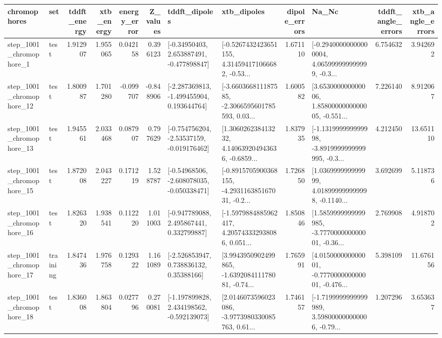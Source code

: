 \begin{tabular}{llrrrrllrlrr}
\toprule
             chromophores &       set &  tddft\_energy &  xtb\_energy &  energy\_error &  Z\_values &                               tddft\_dipoles &                                        xtb\_dipoles &  dipole\_errors &                                              Na\_Nc &  tddft\_angle\_errors &  xtb\_angle\_errors \\
\midrule
  step\_1001\_chromophore\_1 &      test &      1.912907 &    1.955065 &      0.042158 &  0.396123 &    [-0.34950403, 2.653887491, -0.477898847] &  [-0.5267432423651155, 4.314594171066682, -0.53... &       1.671110 &  [-0.29400000000000004, 4.065999999999999, -0.3... &            6.754632 &          3.942692 \\
 step\_1001\_chromophore\_12 &      test &      1.800987 &    1.701280 &     -0.099707 & -0.848906 &   [-2.287369813, -1.499455904, 0.193644764] &  [-3.660366811187585, -2.3066595601785593, 0.03... &       1.600582 &  [3.653000000000006, 1.8580000000000005, -0.551... &            7.226140 &          8.912067 \\
 step\_1001\_chromophore\_13 &      test &      1.945561 &    2.033468 &      0.087907 &  0.797629 &   [-0.754756204, -2.53537159, -0.019176462] &  [1.306026238413232, 4.140639204943636, -0.6859... &       1.837935 &  [-1.131999999999998, -3.8919999999999995, -0.3... &            4.212450 &         13.651110 \\
 step\_1001\_chromophore\_15 &      test &      1.872008 &    2.043227 &      0.171219 &  1.528787 &   [-0.54968506, -2.608078035, -0.050338471] &  [-0.8915705900368155, -4.293116385167031, -0.2... &       1.726850 &  [1.036999999999999, 4.018999999999998, -0.1140... &            3.692699 &          5.118736 \\
 step\_1001\_chromophore\_16 &      test &      1.826320 &    1.938541 &      0.112220 &  1.011003 &    [-0.947789088, 2.495867441, 0.332799887] &  [-1.5979884885962417, 4.205743332938086, 0.051... &       1.850846 &  [1.5859999999999985, -3.777000000000001, -0.36... &            2.769908 &          4.918702 \\
 step\_1001\_chromophore\_17 &  training &      1.847436 &    1.976758 &      0.129322 &  1.161089 &     [-2.526853947, 0.738836132, 0.35388166] &  [3.9943950902499865, -1.639208411178081, -0.74... &       1.765991 &  [4.015000000000001, -0.777000000000001, -0.476... &            5.398109 &         11.676156 \\
 step\_1001\_chromophore\_18 &      test &      1.836008 &    1.863804 &      0.027796 &  0.270081 &   [-1.197899828, 2.434198562, -0.592139073] &  [2.0146073596023086, -3.9773980330085763, 0.61... &       1.746157 &  [-1.7199999999999989, 3.598000000000006, -0.79... &            1.207296 &          3.653637 \\

\end{tabular}
